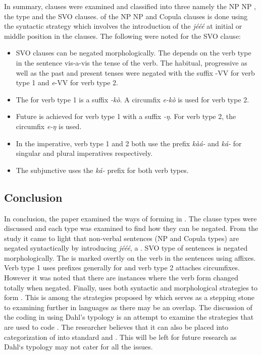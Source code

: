 \documentclass[output=paper,newtxmath,modfonts,nonflat,draftmode]{langsci/langscibook}
\begin{document}
In summary,  clauses were examined and classified into three namely the NP NP , the  type and the SVO clauses.  of the NP NP and Copula clauses is done using the syntactic strategy which involves the introduction of the  \textit{jééé} at initial or middle position in the clauses. The following were noted for the SVO clause:
\begin{itemize}
\item {} SVO clauses can be negated morphologically. The  depends on the verb type in the sentence vis-a-vis the tense of the verb. The habitual, progressive as well as the past and present tenses were negated with the suffix -VV for verb type 1 and \textit{e}-VV for verb type 2.

\item The   for verb type 1 is a suffix \textit{-kò}. A circumfix \textit{e-kò} is used for verb type 2.

\item Future  is achieved for verb type 1 with a suffix \textit{-ŋ}. For verb type 2, the circumfix \textit{e-ŋ} is used.

\item In the imperative, verb type 1 and 2 both use the prefix \textit{kàá-} and \textit{ká-} for singular and plural imperatives respectively.

\item The subjunctive  uses the \textit{ká-} prefix for both verb types.
\end{itemize}

\subsection{\label{sec:ollennu:3.1} Conclusion}

In conclusion, the paper examined the ways of forming  in . The clause types were discussed and each type was examined to find how they can be negated. From the study it came to light that non-verbal sentences (NP and Copula types) are negated syntactically by introducing \textit{jééé}, a . SVO type of sentences is negated morphologically. The  is marked overtly on the verb in the sentences using affixes. Verb type 1 uses prefixes generally for  and verb type 2 attaches circumfixes. However it was noted that there are instances where the verb form changed totally when negated. Finally,  uses both syntactic and morphological strategies to form . This is among the strategies proposed by \citet{dahl1979typology} which serves as a stepping stone to examining  further in  languages as there may be an overlap. The discussion of the  coding in  using Dahl’s typology is an attempt to examine the strategies that are used to code . The researcher believes that it can also be placed into \citet{Miestamo2007} categorization of  into standard and . This will be left for future research as Dahl‘s typology may not cater for all the issues.
\end{document}

